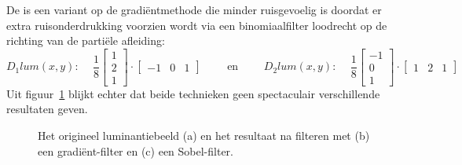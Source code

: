 De  is een variant op de gradi\"entmethode die minder ruisgevoelig 
is doordat er 
extra ruisonderdrukking voorzien wordt via een binomiaalfilter loodrecht op de richting 
van de parti\"ele afleiding:
\begin{displaymath}
D_1 lum(x,y)\textrm{: }\quad \frac{1}{8} \left[ \begin{array}{c} 1 \\ 2 \\ 1 \end{array} \right] \cdot \left[ \begin{array}{ccc} -1 & 0 & 1 \end{array} \right] \qquad \textrm{ en } 
\qquad D_2 lum(x,y)\textrm{: }\quad \frac{1}{8} \left[ \begin{array}{c} -1 \\ 0 \\ 1 \end{array} \right] \cdot \left[ \begin{array}{ccc} 1 & 2 & 1 \end{array} \right]
\end{displaymath}
Uit figuur~\ref{fig:randdetectie} blijkt echter dat beide technieken geen spectaculair verschillende 
resultaten geven.

\begin{figure}[!bp]
\vspace{10pt}
\centering
{}
\caption{\label{fig:randdetectie}Het origineel luminantiebeeld (a) en het resultaat na 
filteren met (b) een gradi\"ent-filter en (c) een Sobel-filter.}
\end{figure}


